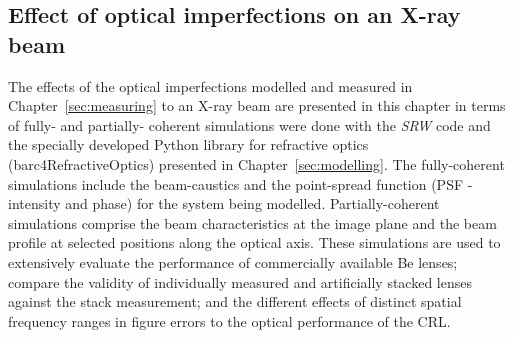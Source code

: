
\begin{refsection}
\chapter{Effect of optical imperfections on an X-ray beam}
\label{sec:effect_optical_imperfections}

The effects of the optical imperfections modelled and measured in Chapter~\ref{sec:measuring} to an X-ray beam are presented in this chapter in terms of fully- and partially- coherent simulations were done with the \textit{SRW} code and the specially developed Python library for refractive optics (barc4RefractiveOptics) presented in Chapter~\ref{sec:modelling}. The fully-coherent simulations include the beam-caustics and the point-spread function (PSF - intensity and phase) for the system being modelled. Partially-coherent simulations comprise the beam characteristics at the image plane and the beam profile at selected positions along the optical axis. These simulations are used to extensively evaluate the performance of commercially available Be lenses; compare the validity of individually measured and artificially stacked lenses against the stack measurement; and the different effects of distinct spatial frequency ranges in figure errors to the optical performance of the CRL.


\end{refsection}
